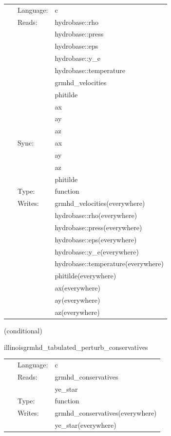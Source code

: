  \begin{tabular*}{160mm}{cll} 
~ & Language:  & c \\ 
~ & Reads:  & hydrobase::rho \\ 
~& ~ &hydrobase::press\\ 
~& ~ &hydrobase::eps\\ 
~& ~ &hydrobase::y\_e\\ 
~& ~ &hydrobase::temperature\\ 
~& ~ &grmhd\_velocities\\ 
~& ~ &phitilde\\ 
~& ~ &ax\\ 
~& ~ &ay\\ 
~& ~ &az\\ 
~ & Sync:  & ax \\ 
~& ~ &ay\\ 
~& ~ &az\\ 
~& ~ &phitilde\\ 
~ & Type:  & function \\ 
~ & Writes:  & grmhd\_velocities(everywhere) \\ 
~& ~ &hydrobase::rho(everywhere)\\ 
~& ~ &hydrobase::press(everywhere)\\ 
~& ~ &hydrobase::eps(everywhere)\\ 
~& ~ &hydrobase::y\_e(everywhere)\\ 
~& ~ &hydrobase::temperature(everywhere)\\ 
~& ~ &phitilde(everywhere)\\ 
~& ~ &ax(everywhere)\\ 
~& ~ &ay(everywhere)\\ 
~& ~ &az(everywhere)\\ 
\end{tabular*} 


\vspace{5mm}

   (conditional) 

\hspace{5mm} illinoisgrmhd\_tabulated\_perturb\_conservatives 

\hspace{5mm}{\it tabulated version of illinoisgrmhd\_perturb\_conservatives } 


\hspace{5mm}

 \begin{tabular*}{160mm}{cll} 
~ & Language:  & c \\ 
~ & Reads:  & grmhd\_conservatives \\ 
~& ~ &ye\_star\\ 
~ & Type:  & function \\ 
~ & Writes:  & grmhd\_conservatives(everywhere) \\ 
~& ~ &ye\_star(everywhere)\\ 
\end{tabular*} 


